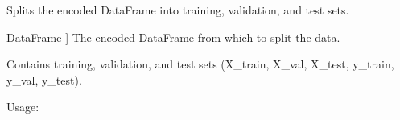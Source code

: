 \documentclass[letterpaper,10pt,english]{sphinxmanual}
\begin{document}

\begin{fulllineitems}
\label{\detokenize{utils:utils.split_data}}
\pysigstartsignatures
{}
\pysigstopsignatures
\sphinxAtStartPar
Splits the encoded DataFrame into training, validation, and test sets.
\begin{description}
\begin{description}
\sphinxlineitem{df\_encoded}{[}DataFrame {]}
\sphinxAtStartPar
The encoded DataFrame from which to split the data.

\end{description}

\begin{description}
\sphinxAtStartPar
Contains training, validation, and test sets (X\_train, X\_val, X\_test, y\_train, y\_val, y\_test).

\end{description}

\end{description}

\sphinxAtStartPar
Usage:

\end{fulllineitems}

\end{document}
